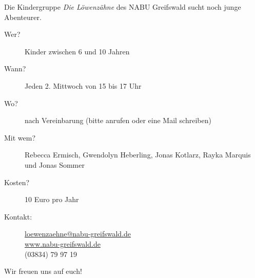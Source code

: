 \newpage
{}

Die Kindergruppe \textit{Die Löwenzähne} des NABU Greifswald sucht noch junge Abenteurer.%
\begin{description}
 \item[Wer?] Kinder zwischen 6 und 10 Jahren
 \item[Wann?] Jeden 2. Mittwoch von 15 bis 17 Uhr
 \item[Wo?] nach Vereinbarung (bitte anrufen oder eine Mail schreiben)
 \item[Mit wem?] Rebecca Ermisch, Gwendolyn Heberling, Jonas Kotlarz, Rayka Marquis und  Jonas Sommer
 \item[Kosten?] 10 Euro pro Jahr
 \item[Kontakt:] \url{loewenzaehne@nabu-greifswald.de}\\
\url{www.nabu-greifswald.de}\\
(03834) 79 97 19 
 \end{description}
 \begin{center}
  Wir freuen uns auf euch!
 \end{center}
